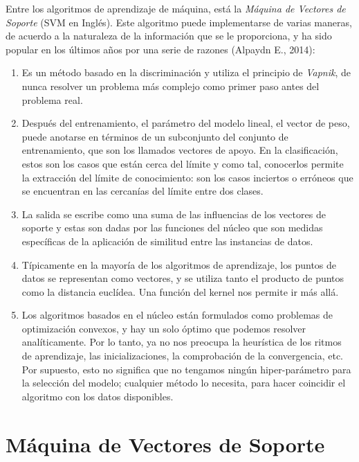 Entre los algoritmos de aprendizaje de máquina, está la \textit{Máquina de Vectores de Soporte} (SVM en Inglés). Este algoritmo puede implementarse de varias maneras, de acuerdo a la naturaleza de la información que se le proporciona, y ha sido popular en los últimos años por una serie de razones (Alpaydn E., 2014): 
\begin{enumerate}
\item Es un método basado en la discriminación y utiliza el principio de \textit{Vapnik}, de nunca resolver un problema más complejo como primer paso antes del problema real. 
\item Después del entrenamiento, el parámetro del modelo lineal, el vector de peso, puede anotarse en términos de un subconjunto del conjunto de entrenamiento, que son los llamados vectores de apoyo. En la clasificación, estos son los casos que están cerca del límite y como tal, conocerlos permite la extracción del límite de conocimiento: son los casos inciertos o erróneos que se encuentran en las cercanías del límite entre dos clases.  
\item La salida se escribe como una suma de las influencias de los vectores de soporte y estas son dadas por las funciones del núcleo que son medidas específicas de la aplicación de similitud entre las instancias de datos. 
\item Típicamente en la mayoría de los algoritmos de aprendizaje, los puntos de datos se representan como vectores, y se utiliza tanto el producto de puntos como la distancia euclídea.  Una función del kernel nos permite ir más allá. 
\item Los algoritmos basados en el núcleo están formulados como problemas de optimización convexos, y hay un solo óptimo que podemos resolver analíticamente. Por lo tanto, ya no nos preocupa la heurística de los ritmos de aprendizaje, las inicializaciones, la comprobación de la convergencia, etc. Por supuesto, esto no significa que no tengamos ningún hiper-parámetro para la selección del modelo; cualquier método lo necesita, para hacer coincidir el algoritmo con los datos disponibles.
\end{enumerate}

\section{Máquina de Vectores de Soporte}

